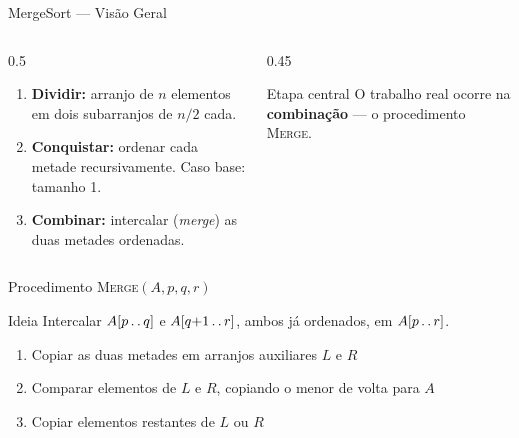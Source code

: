 \documentclass[aspectratio=169]{beamer}
\newcommand{\impt}[1]{\textcolor{maccent}{\textbf{#1}}}
\newcommand{\twodots}{\mathinner{\ldotp\ldotp}}
\begin{document}
\begin{frame}{MergeSort --- Visão Geral}
\begin{columns}[T]
\begin{column}{0.5\textwidth}
\begin{enumerate}
    \item \textbf{Dividir:} arranjo de $n$ elementos em dois subarranjos de $n/2$ cada.
    \pause
    \item \textbf{Conquistar:} ordenar cada metade recursivamente. Caso base: tamanho 1.
    \pause
    \item \textbf{Combinar:} intercalar (\textit{merge}) as duas metades ordenadas.
\end{enumerate}
\end{column}
\begin{column}{0.45\textwidth}
\begin{alertblock}{Etapa central}
O trabalho real ocorre na \impt{combinação} --- o procedimento \textsc{Merge}.
\end{alertblock}
\end{column}
\end{columns}
\end{frame}


\begin{frame}{Procedimento \textsc{Merge}$(A, p, q, r)$}
\begin{block}{Ideia}
Intercalar $A[p\twodots q]$ e $A[q{+}1\twodots r]$, ambos já ordenados, em $A[p\twodots r]$.
\end{block}

\vspace{0.2cm}

\begin{enumerate}
    \item Copiar as duas metades em arranjos auxiliares $L$ e $R$
    \pause
    \item Comparar elementos de $L$ e $R$, copiando o menor de volta para $A$
    \pause
    \item Copiar elementos restantes de $L$ ou $R$
\end{enumerate}
\end{frame}

\end{document}
